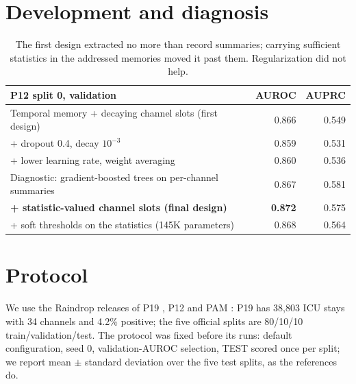 \documentclass[11pt]{article}
\begin{document}
\section{Development and diagnosis}\label{sec:dev}
\begin{table}[h]
\centering\small
\begin{tabular}{@{}p{8.6cm}rr@{}}
\toprule
P12 split 0, validation & AUROC & AUPRC \\
\midrule
Temporal memory + decaying channel slots (first design) & 0.866 & 0.549 \\
\quad + dropout 0.4, decay $10^{-3}$ & 0.859 & 0.531 \\
\quad + lower learning rate, weight averaging & 0.860 & 0.536 \\
Diagnostic: gradient-boosted trees on per-channel summaries & 0.867 & 0.581 \\
\textbf{+ statistic-valued channel slots (final design)} & \textbf{0.872} & 0.575 \\
\quad + soft thresholds on the statistics (145K parameters) & 0.868 & 0.564 \\
\bottomrule
\end{tabular}
\caption{The first design extracted no more than record summaries; carrying sufficient statistics in the addressed memories moved it past them. Regularization did not help.}
\label{tab:dev}
\end{table}

\section{Protocol}
We use the Raindrop releases of P19 \citep{reyna2020sepsis}, P12 \citep{silva2012p12} and PAM \citep{reiss2012pamap2}: P19 has 38,803 ICU stays with 34 channels and 4.2\% positive; the five official splits are 80/10/10 train/validation/test. The protocol was fixed before its runs: default configuration, seed 0, validation-AUROC selection, TEST scored once per split; we report mean $\pm$ standard deviation over the five test splits, as the references do.
\end{document}
